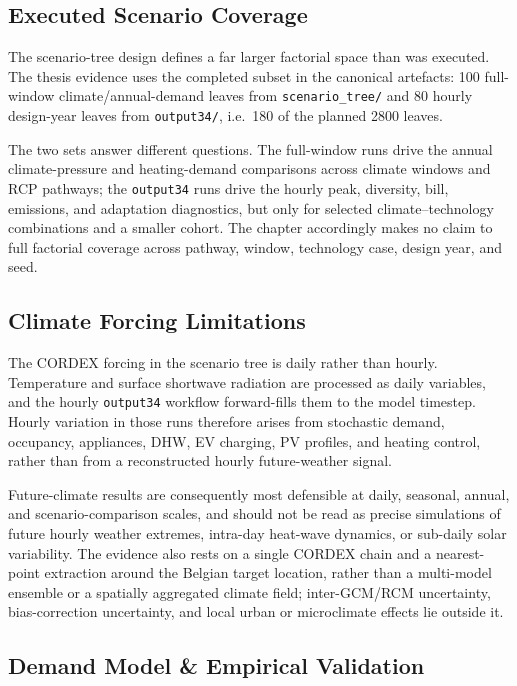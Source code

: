 \subsection{Executed Scenario Coverage}
\label{sec:limitationsScenarioCoverage}

The scenario-tree design defines a far larger factorial space than was executed. The thesis evidence uses the completed subset in the canonical artefacts: 100 full-window climate/annual-demand leaves from \texttt{scenario\_tree/} and 80 hourly design-year leaves from \texttt{output34/}, i.e.\ 180 of the planned 2800 leaves.

The two sets answer different questions. The full-window runs drive the annual climate-pressure and heating-demand comparisons across climate windows and RCP pathways; the \texttt{output34} runs drive the hourly peak, diversity, bill, emissions, and adaptation diagnostics, but only for selected climate--technology combinations and a smaller cohort. The chapter accordingly makes no claim to full factorial coverage across pathway, window, technology case, design year, and seed.


\subsection{Climate Forcing Limitations}
\label{sec:limitationsClimateForcing}

The CORDEX forcing in the scenario tree is daily rather than hourly. Temperature and surface shortwave radiation are processed as daily variables, and the hourly
\texttt{output34} workflow forward-fills them to the model timestep. Hourly variation in those runs therefore arises from stochastic demand, occupancy, appliances, DHW, EV charging, PV profiles, and heating control, rather than from a reconstructed hourly future-weather signal.

Future-climate results are consequently most defensible at daily, seasonal, annual, and scenario-comparison scales, and should not be read as precise simulations of future hourly weather extremes, intra-day heat-wave dynamics, or sub-daily solar variability. The evidence also rests on a single CORDEX chain and a nearest-point extraction around the Belgian target location, rather than a multi-model ensemble or a spatially aggregated climate field; inter-GCM/RCM uncertainty, bias-correction uncertainty, and local urban or microclimate effects lie outside it.


\subsection{Demand Model \& Empirical Validation}
\label{sec:limitationsValidation}

